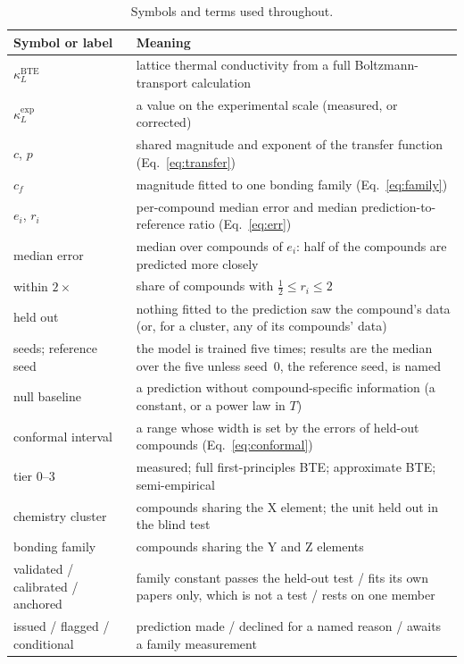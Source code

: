\begin{table}[tbp]
  \centering
  \caption{Symbols and terms used throughout.}
  \label{tab:notation}
  \footnotesize
  \setlength{\tabcolsep}{3pt}
  \begin{tabular}{>{\raggedright\arraybackslash}p{}>{\raggedright\arraybackslash}p{}}
    \toprule
    Symbol or label & Meaning \\
    \midrule
    $\kappa_L^{\mathrm{BTE}}$ & lattice thermal conductivity from a full Boltzmann-transport calculation \\
    $\kappa_L^{\mathrm{exp}}$ & a value on the experimental scale (measured, or corrected) \\
    $c$, $p$ & shared magnitude and exponent of the transfer function (Eq.~\eqref{eq:transfer}) \\
    $c_f$ & magnitude fitted to one bonding family (Eq.~\eqref{eq:family}) \\
    $e_i$, $r_i$ & per-compound median error and median prediction-to-reference ratio (Eq.~\eqref{eq:err}) \\
    median error & median over compounds of $e_i$: half of the compounds are predicted more closely \\
    within $2\times$ & share of compounds with $\tfrac12 \le r_i \le 2$ \\
    held out & nothing fitted to the prediction saw the compound's data (or, for a cluster, any of its compounds' data) \\
    seeds; reference seed & the model is trained five times; results are the median over the five unless seed~0, the reference seed, is named \\
    null baseline & a prediction without compound-specific information (a constant, or a power law in $T$) \\
    conformal interval & a range whose width is set by the errors of held-out compounds (Eq.~\eqref{eq:conformal}) \\
    tier 0--3 & measured; full first-principles BTE; approximate BTE; semi-empirical \\
    chemistry cluster & compounds sharing the X element; the unit held out in the blind test \\
    bonding family & compounds sharing the Y and Z elements \\
    validated / calibrated / anchored & family constant passes the held-out test / fits its own papers only, which is not a test / rests on one member \\
    issued / flagged / conditional & prediction made / declined for a named reason / awaits a family measurement \\
    \bottomrule
  \end{tabular}
\end{table}

